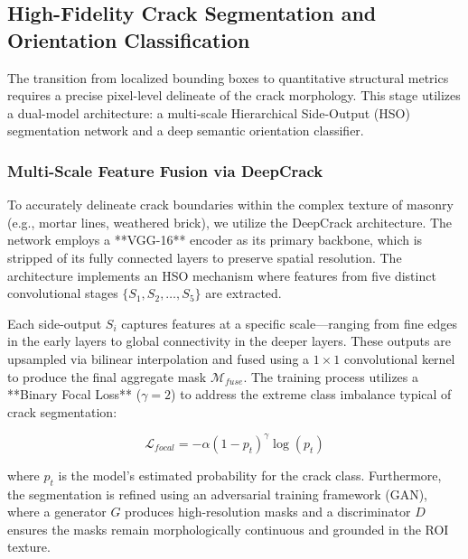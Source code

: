 \subsection{High-Fidelity Crack Segmentation and Orientation Classification}
\label{sec:segmentation_orientation}

\begin{sloppypar}
The transition from localized bounding boxes to quantitative structural metrics requires a precise pixel-level delineate of the crack morphology. This stage utilizes a dual-model architecture: a multi-scale Hierarchical Side-Output (HSO) segmentation network and a deep semantic orientation classifier.
\end{sloppypar}

\subsubsection{Multi-Scale Feature Fusion via DeepCrack}
\begin{sloppypar}
To accurately delineate crack boundaries within the complex texture of masonry (e.g., mortar lines, weathered brick), we utilize the DeepCrack architecture. The network employs a **VGG-16** encoder as its primary backbone, which is stripped of its fully connected layers to preserve spatial resolution. The architecture implements an HSO mechanism where features from five distinct convolutional stages $\{S_1, S_2, \dots, S_5\}$ are extracted. 
\end{sloppypar}

\begin{sloppypar}
Each side-output $S_i$ captures features at a specific scale—ranging from fine edges in the early layers to global connectivity in the deeper layers. These outputs are upsampled via bilinear interpolation and fused using a $1 \times 1$ convolutional kernel to produce the final aggregate mask $\mathcal{M}_{fuse}$. The training process utilizes a **Binary Focal Loss** ($\gamma=2$) to address the extreme class imbalance typical of crack segmentation:
\end{sloppypar}

\begin{equation}
    \mathcal{L}_{focal} = -\alpha (1 - p_t)^\gamma \log(p_t)
\end{equation}

\noindent where $p_t$ is the model's estimated probability for the crack class. Furthermore, the segmentation is refined using an adversarial training framework (GAN), where a generator $G$ produces high-resolution masks and a discriminator $D$ ensures the masks remain morphologically continuous and grounded in the ROI texture.


